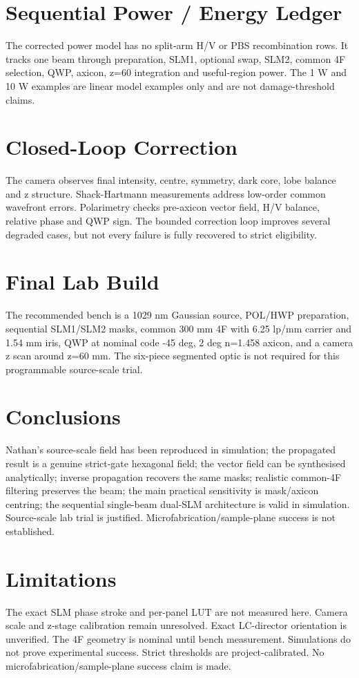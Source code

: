 \documentclass[11pt]{article}
\begin{document}
\section{Sequential Power / Energy Ledger}
The corrected power model has no split-arm H/V or PBS recombination rows. It tracks one beam through preparation, SLM1, optional swap, SLM2, common 4F selection, QWP, axicon, z=60 integration and useful-region power. The 1 W and 10 W examples are linear model examples only and are not damage-threshold claims.

\section{Closed-Loop Correction}
The camera observes final intensity, centre, symmetry, dark core, lobe balance and z structure. Shack-Hartmann measurements address low-order common wavefront errors. Polarimetry checks pre-axicon vector field, H/V balance, relative phase and QWP sign. The bounded correction loop improves several degraded cases, but not every failure is fully recovered to strict eligibility.

\section{Final Lab Build}
The recommended bench is a 1029 nm Gaussian source, POL/HWP preparation, sequential SLM1/SLM2 masks, common 300 mm 4F with 6.25 lp/mm carrier and 1.54 mm iris, QWP at nominal code -45 deg, 2 deg n=1.458 axicon, and a camera z scan around z=60 mm. The six-piece segmented optic is not required for this programmable source-scale trial.

\section{Conclusions}
Nathan's source-scale field has been reproduced in simulation; the propagated result is a genuine strict-gate hexagonal field; the vector field can be synthesised analytically; inverse propagation recovers the same masks; realistic common-4F filtering preserves the beam; the main practical sensitivity is mask/axicon centring; the sequential single-beam dual-SLM architecture is valid in simulation. Source-scale lab trial is justified. Microfabrication/sample-plane success is not established.

\section{Limitations}
The exact SLM phase stroke and per-panel LUT are not measured here. Camera scale and z-stage calibration remain unresolved. Exact LC-director orientation is unverified. The 4F geometry is nominal until bench measurement. Simulations do not prove experimental success. Strict thresholds are project-calibrated. No microfabrication/sample-plane success claim is made.
\end{document}
